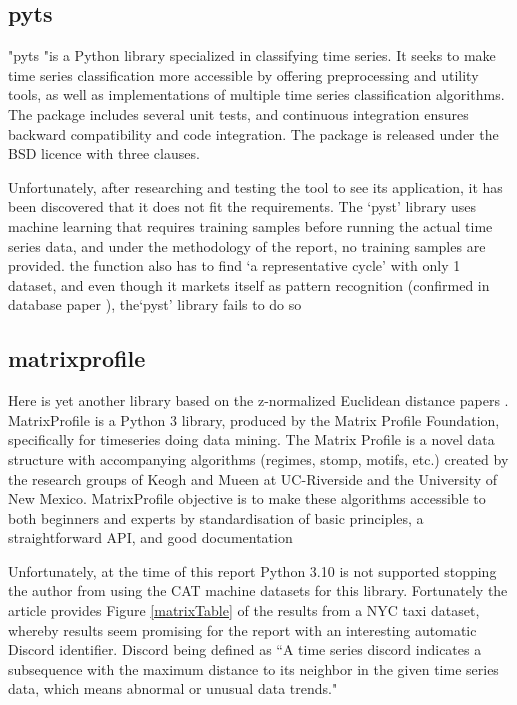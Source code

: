 \subsection{pyts}
"pyts "is a Python library specialized in classifying time series. It seeks to make time series classification more accessible by offering preprocessing and utility tools, as well as implementations of multiple time series classification algorithms. The package includes several unit tests, and continuous integration ensures backward compatibility and code integration. The package is released under the BSD licence with three clauses.  \cite{JMLR:v21:19-763}


Unfortunately, after researching and testing the tool to see its application, it has been discovered that it does not fit the requirements. The `pyst' library uses machine learning that requires training samples before running the actual time series data, and under the methodology of the report, no training samples are provided. the function also has to find `a representative cycle' with only 1 dataset, and even though it markets itself as pattern recognition (confirmed in database paper \cite{DBLP:journals/corr/abs-2104-07406}), the`pyst' library fails to do so 

\subsection{matrixprofile}

Here is yet another library based on the z-normalized Euclidean distance papers \cite{zhu_imamura_nikovski_keogh_2017}. 
MatrixProfile is a Python 3 library, produced by the Matrix Profile Foundation, specifically for timeseries doing data mining. The Matrix Profile is a novel data structure with accompanying algorithms (regimes, stomp, motifs, etc.) created by the research groups of Keogh and Mueen at UC-Riverside and the University of New Mexico. MatrixProfile objective is to make these algorithms accessible to both beginners and experts by standardisation of basic principles, a straightforward API, and good documentation \cite{Van_Benschoten2020} 

Unfortunately, at the time of this report Python 3.10 is not supported stopping the author from using the CAT machine datasets for this library. Fortunately the article \cite{Van_Benschoten2020} provides Figure \ref{matrixTable} of the results from a NYC taxi dataset, whereby results seem promising for the report with an interesting automatic Discord identifier. Discord being defined as ``A time series discord indicates a subsequence with the maximum distance to its neighbor in the given time series data, which means abnormal or unusual data trends."\cite{woodbridge_wilson_rintoul_goldstein_2015}

